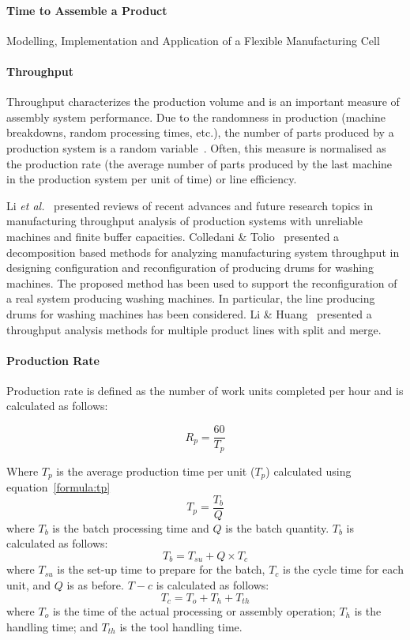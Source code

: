 \paragraph{Time to Assemble a Product}
Modelling, Implementation and Application of a Flexible
Manufacturing Cell

\paragraph{Throughput}
Throughput characterizes the production volume and is an important measure of assembly system performance. Due to the randomness in production (machine breakdowns, random processing times, etc.), the number of parts produced by a production system is a random variable~\cite{Li.2009}. Often, this measure is normalised as the production rate (the average number of parts produced by the last machine in the production system per unit of time) or line efficiency.

Li \textit{et al.}~\cite{Li.2009} presented reviews of recent advances and future research topics in manufacturing throughput analysis of production systems with unreliable machines and finite buffer capacities. Colledani \& Tolio~\cite{Colledani.2005} presented a decomposition based methods for analyzing manufacturing system throughput in designing configuration and reconfiguration of producing drums for washing machines. The proposed method has been used to support the reconfiguration of a real system producing washing machines. In particular, the line producing drums for washing machines has been considered. Li \& Huang~\cite{Li.2004} presented a throughput analysis methods for multiple product lines with split and merge.

\paragraph{Production Rate}
Production rate is defined as the number of work units completed per hour and is calculated as follows:

\begin{equation}
R_p = \frac{60}{T_p}
\end{equation}

Where $T_p$ is the average production time per unit ($T_p$) calculated using equation~\ref{formula:tp}
\begin{equation}
\label{formula:tp}
T_p = \frac{T_b}{Q}
\end{equation}
where $T_b$ is the batch processing time and $Q$ is the batch quantity. $T_b$ is calculated as follows:
\begin{equation}
T_b = T_{su}+Q\times T_c
\end{equation}
where $T_{su}$ is the set-up time to prepare for the batch, $T_c$ is the cycle time for each unit, and $Q$ is as before. $T-c$ is calculated as follows:
\begin{equation}
T_c = T_{o}+T_h+T_{th}
\end{equation}
where $T_o$ is the time of the actual processing or assembly operation; $T_h$ is the handling time; and $T_{th}$ is the tool handling time.

